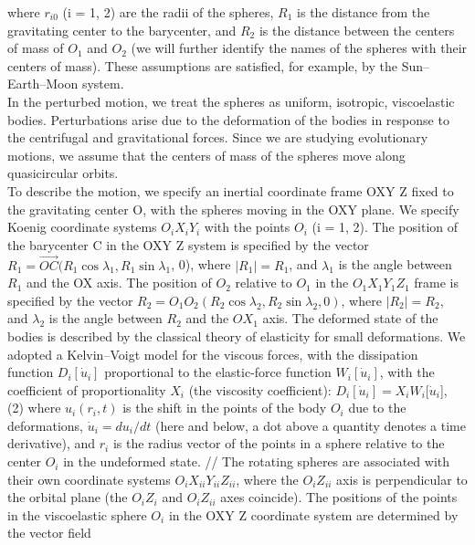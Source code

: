 \documentclass[12pt]{article}
\begin{document}
\begin{multicols}{2}
where $r_{i0}$ (i = 1, 2) are the radii of the spheres, $R_{1}$
is the distance from the gravitating center to the
barycenter, and $R_{2}$ is the distance between the centers
of mass of $O_{1}$ and $O_{2}$ (we will further identify
the names of the spheres with their centers of mass).
These assumptions are satisfied, for example, by the
Sun–Earth–Moon system.\\
In the perturbed motion, we treat the spheres as
uniform, isotropic, viscoelastic bodies. Perturbations
arise due to the deformation of the bodies in response
to the centrifugal and gravitational forces. Since we
are studying evolutionary motions, we assume that
the centers of mass of the spheres move along quasicircular
orbits.\\
To describe the motion, we specify an inertial
coordinate frame OXY Z fixed to the gravitating
center O, with the spheres moving in the OXY
plane. We specify Koenig coordinate systems ${O_i}{X_i}{Y_i}$
with the points ${O_i}$ (i = 1, 2). The position of the barycenter C in the OXY Z system is specified by
the vector ${R_1} = \vec{OC} ({R_1} \cos {\lambda_1}, {R_1} \sin {\lambda_1}$, 0), where
$|{R_1}| = {R_1}$, and ${\lambda_1}$ is the angle between ${R_1}$ and the
OX axis. The position of ${O_2}$ relative to ${O_1}$ in the
${O_1}{X_1}{Y_1}{Z_1}$ frame is specified by the vector ${R_2} = {O_1}{O_2}({R_2} \cos {\lambda_2}, {R_2} \sin {\lambda_2}, 0)$, where 
$|{R_2}| = {R_2}$,  and
${\lambda_2}$ is the angle between ${R_2}$ and the $O{X_1}$ axis. The
deformed state of the bodies is described by the classical
theory of elasticity for small deformations. We
adopted a Kelvin–Voigt model for the viscous forces,
with the dissipation function ${D_i}[{\dot{u}_i}]$ proportional to
the elastic-force function ${W_i}[{\dot{u}_i}]$, with the coefficient
of proportionality ${X_i}$ (the viscosity coefficient):
${D_i}[{\dot{u}_i}] = {X_i}{W_i}[{\dot{u}_i}$], (2)
where ${u_i}({r_i}, t)$ is the shift in the points of the body ${O_i}$
due to the deformations, ${\dot{u}_i} = d{u_i}/dt$ (here and below,
a dot above a quantity denotes a time derivative), and
${r_i}$ is the radius vector of the points in a sphere relative
to the center ${O_i}$ in the undeformed state.
//
The rotating spheres are associated with their own
coordinate systems ${O_i}{X_{ii}}{Y_{ii}}{Z_{ii}}$, where the ${O_i}{Z_{ii}}$ axis
is perpendicular to the orbital plane (the ${O_i}{Z_i}$ and
${O_i}{Z_{ii}}$ axes coincide). The positions of the points in
the viscoelastic sphere ${O_i}$ in the OXY Z coordinate
system are determined by the vector field

\end{multicols}
\end{document}
